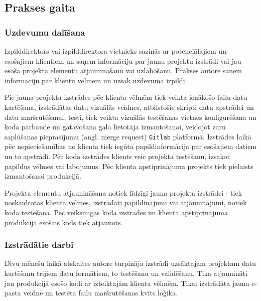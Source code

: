 \subsection{Prakses gaita}
\subsubsection{Uzdevumu dalīšana}
Izpilddirektors vai izpilddirektora vietnieks sazinās ar potenciālajiem un esošajiem klientiem un saņem informāciju par jaunu projektu izstrādi vai jau esoša projekta elementu atjaunināšanu vai uzlabošanu. Prakses autore saņem informāciju par klientu vēlmēm un uzsāk uzdevuma izpildi.
\par Pie jauna projekta izstrādes pēc klienta vēlmēm tiek veikta ienākošo failu datu kartēšana, izstrādātas datu vizuālās veidnes, atbilstošie skripti datu apstrādei un datu maršrutēšanai, testi, tiek veikta vizuālās testēšanas vietnes konfigurēšana un koda pārbaude un gatavošana gala lietotāja izmantošanai, veidojot zaru saplūšanas pieprasījumu (angl. merge request) \texttt{Gitlab} platformā. Izstrādes laikā pēc nepieciešamības no klienta tiek iegūta papildinformācija par esošajiem datiem un to apstrādi. Pēc koda izstrādes klients veic projekta testēšanu, izsakot papildus vēlmes vai labojumus. Pēc klienta apstiprinājuma projekts tiek pielaists izmantošanai produkcijā.
\par Projekta elementu atjaunināšana notiek līdzīgi jauna projekta izstrādei - tiek noskaidrotas klienta vēlmes, izstrādāti papildinājumi vai atjauninājumi, notiek koda testēšana. Pēc veiksmīgas koda izstrādes un klienta apstiprinājuma produkcijā esošais kods tiek atjaunots.

\subsubsection{Izstrādātie darbi}
Divu mēnešu laikā atskaites autore turpināja izstrādi uzsāktajam projektam datu kartēšanu trijiem datu formātiem, to testēšanu un validēšanu. Tika atjaunināti jau produkcijā esošo kodi ar izteiktajām klienta vēlmēm. Tikai izstrādāta jauna e-pasta veidne un testēta failu maršrutēšanas kvīts loģika.

